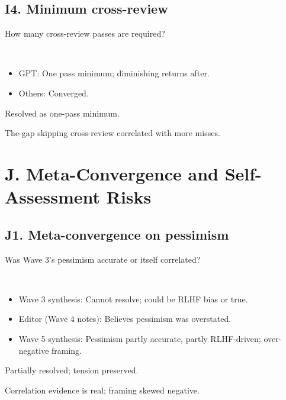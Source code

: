 \documentclass[11pt,letterpaper]{article}
\begin{document}
\subsection{I4. Minimum cross-review}

\begin{reflist}
\item[Dispute:] How many cross-review passes are required?
\item[Positions:]~
  \begin{itemize}[nosep]
    \item GPT: One pass minimum; diminishing returns after.
    \item Others: Converged.
  \end{itemize}
\item[Status:] Resolved as one-pass minimum.
\item[Evidence:] The-gap skipping cross-review correlated with more misses.
\end{reflist}

\section{J. Meta-Convergence and Self-Assessment Risks}

\subsection{J1. Meta-convergence on pessimism}

\begin{reflist}
\item[Dispute:] Was Wave 3's pessimism accurate or itself correlated?
\item[Positions:]~
  \begin{itemize}[nosep]
    \item Wave 3 synthesis: Cannot resolve; could be RLHF bias or true.
    \item Editor (Wave 4 notes): Believes pessimism was overstated.
    \item Wave 5 synthesis: Pessimism partly accurate, partly RLHF-driven; over-negative framing.
  \end{itemize}
\item[Status:] Partially resolved; tension preserved.
\item[Evidence:] Correlation evidence is real; framing skewed negative.
\end{reflist}
\end{document}
